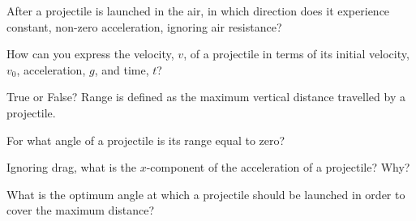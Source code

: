 \documentclass[main-physics.tex]{subfiles}
\begin{document}
\begin{exercise} \label{sy5RGT}
    After a projectile is launched in the air, in which direction does it experience constant, non-zero acceleration, ignoring air resistance?
\end{exercise}



\begin{exercise} \label{wlbvvu}
    How can you express the velocity, $v$, of a projectile in terms of its initial velocity, $v_0$, acceleration, $g$, and time, $t$?
\end{exercise}



\begin{exercise} \label{xj6gln}
    True or False? Range is defined as the maximum vertical distance travelled by a projectile. 
\end{exercise}

\begin{exercise} \label{5wfdN0}
    For what angle of a projectile is its range equal to zero?
\end{exercise}

\begin{exercise} \label{DnqDpu}
    Ignoring drag, what is the $x$-component of the acceleration of a projectile? Why?
\end{exercise}

\begin{exercise} \label{QsBUvP}
    What is the optimum angle at which a projectile should be launched in order to cover the maximum distance?
\end{exercise}
\end{document}
